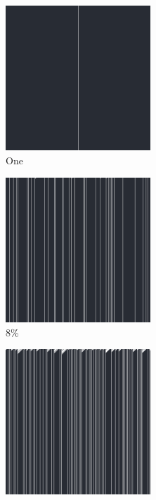 \documentclass[12pt, fleqn]{report}                             %
\theoremstyle{break}                                            %
\begin{document}
      \begin{figure}[ht!]
        \centering
        \begin{subfigure}[b]{0.4\linewidth}
          \includegraphics[width=0.6\textwidth]{Images/172/a.png}
          \caption{One}
        \end{subfigure}
        \begin{subfigure}[b]{0.4\linewidth}
          \includegraphics[width=0.6\textwidth]{Images/172/b.png}
          \caption{8\%}
        \end{subfigure}
        \begin{subfigure}[b]{0.4\linewidth}
          \includegraphics[width=0.6\textwidth]{Images/172/c.png}

\end{subfigure}
\end{figure}
\end{document}
